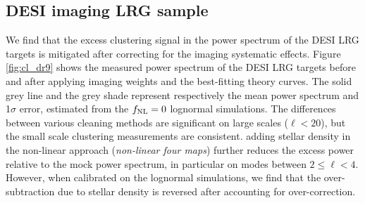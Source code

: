 \subsection{DESI imaging LRG sample}
We find that the excess clustering signal in the power spectrum of the DESI LRG targets is mitigated after correcting for the imaging systematic effects. Figure \ref{fig:cl_dr9} shows the measured power spectrum of the DESI LRG targets before and after applying imaging weights and the best-fitting theory curves. The solid grey line and the grey shade represent respectively the mean power spectrum and 1$\sigma$ error, estimated from the $f_{\rm NL}=0$ lognormal simulations. The differences between various cleaning methods are significant on large scales ($\ell < 20$), but the small scale clustering measurements are consistent.    adding stellar density in the non-linear approach (\textit{non-linear four maps}) further reduces the excess power relative to the mock power spectrum, in particular on modes between $2\leq \ell < 4$. However, when calibrated on the lognormal simulations, we find that the over-subtraction due to stellar density is reversed after accounting for over-correction.


